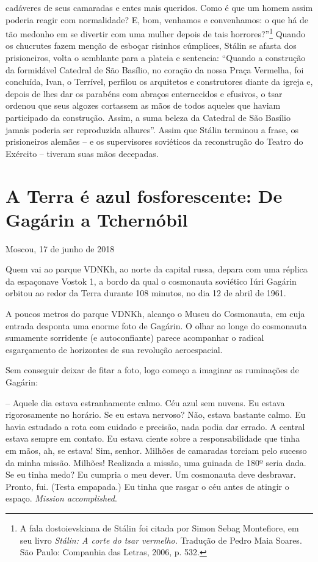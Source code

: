 cadáveres de seus camaradas e entes mais queridos. Como é que um homem
assim poderia reagir com normalidade? E, bom, venhamos e convenhamos: o
que há de tão medonho em se divertir com uma mulher depois de tais
horrores?''\footnote{A fala dostoievskiana de Stálin foi citada por
  Simon Sebag Montefiore, em seu livro \emph{Stálin: A corte do tsar
  vermelho.} Tradução de Pedro Maia Soares. São Paulo: Companhia das
  Letras, 2006, p. 532.} Quando os chucrutes fazem menção de esboçar
risinhos cúmplices, Stálin se afasta dos prisioneiros, volta o semblante
para a plateia e sentencia: ``Quando a construção da formidável Catedral
de São Basílio, no coração da nossa Praça Vermelha, foi concluída, Ivan,
o Terrível, perfilou os arquitetos e construtores diante da igreja e,
depois de lhes dar os parabéns com abraços enternecidos e efusivos, o
tsar ordenou que seus algozes cortassem as mãos de todos aqueles que
haviam participado da construção. Assim, a suma beleza da Catedral de
São Basílio jamais poderia ser reproduzida alhures''. Assim que Stálin
terminou a frase, os prisioneiros alemães -- e os supervisores
soviéticos da reconstrução do Teatro do Exército -- tiveram suas mãos
decepadas.

\chapter*{A Terra é azul fosforescente: De Gagárin a Tchernóbil}

\begin{flushright}
Moscou, 17 de junho de 2018
\end{flushright}

Quem vai ao parque VDNKh, ao norte da capital russa, depara com uma
réplica da espaçonave Vostok 1, a bordo da qual o cosmonauta soviético
Iúri Gagárin orbitou ao redor da Terra durante 108 minutos, no dia 12 de
abril de 1961.

A poucos metros do parque VDNKh, alcanço o Museu do Cosmonauta, em cuja
entrada desponta uma enorme foto de Gagárin. O olhar ao longe do
cosmonauta sumamente sorridente (e autoconfiante) parece acompanhar o
radical esgarçamento de horizontes de sua revolução aeroespacial.

Sem conseguir deixar de fitar a foto, logo começo a imaginar as
ruminações de Gagárin:

-- Aquele dia estava estranhamente calmo. Céu azul sem nuvens. Eu estava
rigorosamente no horário. Se eu estava nervoso? Não, estava bastante
calmo. Eu havia estudado a rota com cuidado e precisão, nada podia dar
errado. A central estava sempre em contato. Eu estava ciente sobre a
responsabilidade que tinha em mãos, ah, se estava! Sim, senhor. Milhões
de camaradas torciam pelo sucesso da minha missão. Milhões! Realizada a
missão, uma guinada de 180º seria dada. Se eu tinha medo? Eu cumpria o
meu dever. Um cosmonauta deve desbravar. Pronto, fui. (Testa empapada.)
Eu tinha que rasgar o céu antes de atingir o espaço. \emph{Mission
accomplished}.

